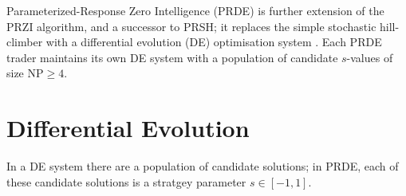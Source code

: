 \documentclass[conference]{IEEEtran}
\begin{document}
Parameterized-Response Zero Intelligence (PRDE) is further extension of the PRZI algorithm, and a successor to PRSH; it replaces the simple stochastic hill-climber with a differential evolution (DE) optimisation system \cite{StornPrice}.
Each PRDE trader maintains its own DE system with a population of candidate $s$-values of size $\mathrm{NP}\ge4$.

\section{Differential Evolution}

In a DE system there are a population of candidate solutions; in PRDE, each of these candidate solutions is a stratgey parameter $s\in[-1,1]$.

\cite{BSE} \cite{BSEPaper}



\end{document}
